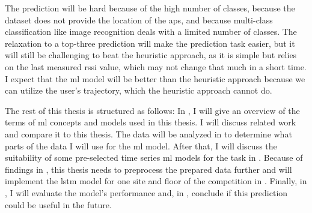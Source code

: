 The prediction will be hard because of the high number of classes, because the dataset does not provide the location of the \acp{ap}, and because  multi-class classification like image recognition deals with a limited number of classes.
The relaxation to a top-three prediction will make the prediction task easier, but it will still be challenging to beat the heuristic approach, as it is simple but relies on the last measured \ac{rssi} value, which may not change that much in a short time. 
I expect that the \ac{ml} model will be better than the heuristic approach because we can utilize the user's trajectory, which the heuristic approach cannot do.

The rest of this thesis is structured as follows:
In , I will give an overview of the terms of \ac{ml} concepts and models used in this thesis.
 I will discuss related work and compare it to this thesis.
The data will be analyzed in  to determine what parts of the data I will use for the \ac{ml} model.
After that, I will discuss the suitability of some pre-selected time series \ac{ml} models for the task in . 
Because of findings in , this thesis needs to preprocess the prepared data further and will implement the \ac{lstm} model for one site and floor of the competition in .
Finally, in , I will evaluate the model's performance and, in , conclude if this prediction could be useful in the future.
